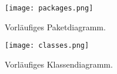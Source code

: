 \begin{figure}[ht]
    \begin{center}
    \texttt{[image: packages.png]}
    \end{center}
    \caption{Vorläufiges Paketdiagramm.}
    \label{fig:Packages}
\end{figure}

\begin{figure}[ht]
    \begin{center}
    \texttt{[image: classes.png]}
    \end{center}
    \caption{Vorläufiges Klassendiagramm.}
    \label{fig:Classes}
\end{figure}
